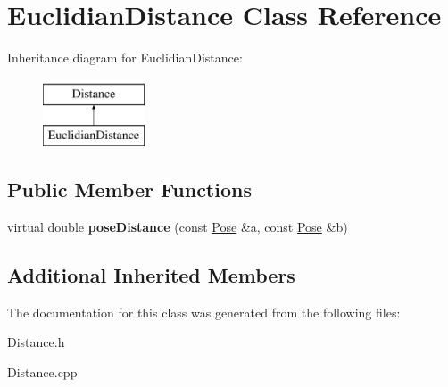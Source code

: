 \hypertarget{classEuclidianDistance}{}\section{Euclidian\+Distance Class Reference}
\label{classEuclidianDistance}
Inheritance diagram for Euclidian\+Distance\+:\begin{figure}[H]
\begin{center}
\leavevmode
\includegraphics[height=2.000000cm]{classEuclidianDistance}
\end{center}
\end{figure}
\subsection*{Public Member Functions}
\begin{DoxyCompactItemize}
\item 
\hypertarget{classEuclidianDistance_a431698e73e8c884d710c40a9d1541833}{}virtual double {\bfseries pose\+Distance} (const \hyperlink{classPose}{Pose} \&a, const \hyperlink{classPose}{Pose} \&b)\label{classEuclidianDistance_a431698e73e8c884d710c40a9d1541833}

\end{DoxyCompactItemize}
\subsection*{Additional Inherited Members}


The documentation for this class was generated from the following files\+:\begin{DoxyCompactItemize}
\item 
Distance.\+h\item 
Distance.\+cpp\end{DoxyCompactItemize}
